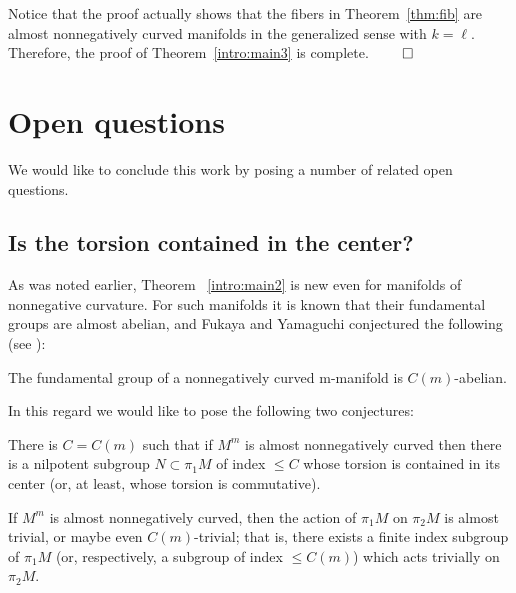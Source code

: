 \documentclass{amsart}
\begin{document}
Notice that the proof actually shows
that the fibers in Theorem~\ref{thm:fib} are almost nonnegatively curved manifolds
in the generalized sense with $k=\ell$. Therefore,
 the proof of Theorem~\ref{intro:main3} is complete. \hfill$\qed$



\section{Open questions}
We would like to conclude this work by posing a number of related open questions.

\subsection{Is the torsion contained in the center?}
As was noted earlier, Theorem ~\ref{intro:main2} is new even for manifolds of nonnegative curvature.
For such manifolds it is known that their fundamental groups  are almost abelian,
and Fukaya and Yamaguchi conjectured the following  (see \cite{FY}):

\begin{conj}\label{con:c-ab}
The fundamental group of a nonnegatively curved  m-manifold is $C(m)$-abelian.
\end{conj}




In this regard we would like to pose the following two conjectures:

\begin{mconj}\label{con:tor}
There is $C=C(m)$ such that if $M^m$ is almost nonnegatively curved then there is a nilpotent subgroup $N\subset \pi_1M$ of index $\le C$ whose torsion is contained in its center (or, at least, whose torsion is commutative).
\end{mconj}

\begin{conj}\label{pi_2}
If $M^m$ is almost nonnegatively curved,
then the action of $\pi_1M$ on $\pi_2M$ is almost trivial, or maybe even $C(m)$-trivial;
that is, there exists a finite index subgroup of $\pi_1M$
(or, respectively,  a subgroup of index $\le C(m)$)
which acts trivially on $\pi_2M$.
\end{conj}

\end{document}

